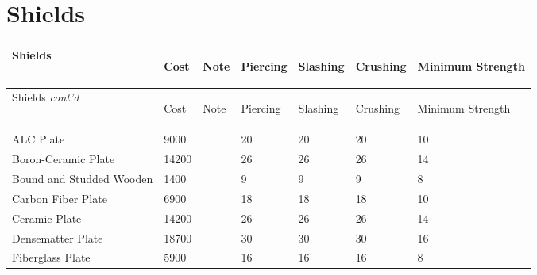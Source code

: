 \documentclass[twoside]{book}
\begin{document}
    

\section{Shields}
    
\begin{longtable}{p{1.25in}llp{3em}p{3em}p{3em}p{3em}} 
  Shields& \begin{turn}{70}{Cost}\end{turn}
          & \begin{turn}{70}{Note}\end{turn}
          & \begin{turn}{70}{Piercing}\end{turn}
          & \begin{turn}{70}{Slashing}\end{turn}
          & \begin{turn}{70}{Crushing}\end{turn}
          & \begin{turn}{70}{Minimum Strength}\end{turn}
          \\
  \hline
  \hline
  \endfirsthead
  Shields \textit{cont'd}
        & \begin{turn}{70}{Cost}\end{turn}
          & \begin{turn}{70}{Note}\end{turn}
          & \begin{turn}{70}{Piercing}\end{turn}
          & \begin{turn}{70}{Slashing}\end{turn}
          & \begin{turn}{70}{Crushing}\end{turn}
          & \begin{turn}{70}{Minimum Strength}\end{turn}
           \\
  \hline
  \endhead
\raggedright ALC Plate & 9000 && 20 & 20 & 20 & 10 \tabularnewline
      \raggedright Boron-Ceramic Plate & 14200 && 26 & 26 & 26 & 14 \tabularnewline
      \raggedright Bound and Studded Wooden
           & 1400 && 9 & 9 & 9 & 8 \tabularnewline
      \raggedright Carbon Fiber Plate & 6900 && 18 & 18 & 18 & 10 \tabularnewline
      \raggedright Ceramic Plate & 14200 && 26 & 26 & 26 & 14 \tabularnewline
      \raggedright Densematter Plate & 18700 && 30 & 30 & 30 & 16 \tabularnewline
      \raggedright Fiberglass Plate & 5900 && 16 & 16 & 16 & 8 \tabularnewline

\end{longtable}
\end{document}
